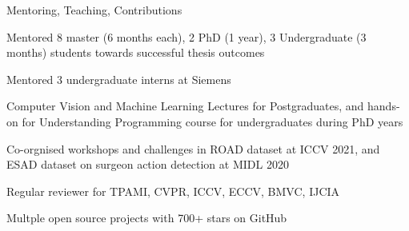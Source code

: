 \documentclass{resume} %
\begin{document}
\begin{paracol}{2}


\begin{rSection}{Mentoring, Teaching, Contributions}{} 
  \begin{sSubsection}{Mentored 8 master (6 months each), 2 PhD (1 year), 3 Undergraduate (3 months) students towards successful thesis outcomes}\end{sSubsection}
  \begin{sSubsection}{Mentored 3 undergraduate interns at Siemens}\end{sSubsection}
    \begin{sSubsection}{Computer Vision and Machine Learning Lectures for Postgraduates, 
      and hands-on for Understanding Programming course for undergraduates during PhD years}\end{sSubsection}
  \begin{sSubsection}{Co-orgnised workshops and challenges in ROAD dataset at ICCV 2021, and ESAD dataset on surgeon action detection at MIDL 2020}\end{sSubsection}
  \begin{sSubsection}{Regular reviewer for TPAMI, CVPR, ICCV, ECCV, BMVC, IJCIA}\end{sSubsection}
  \begin{sSubsection}{Multple open source projects with 700+ stars on GitHub}\end{sSubsection}
\end{rSection}


\end{paracol}
\end{document}
